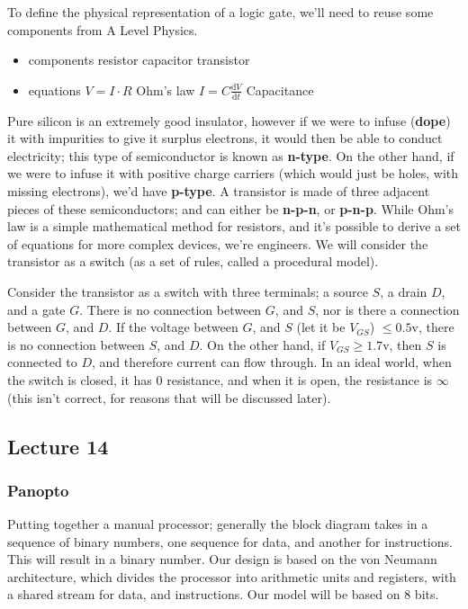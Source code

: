 \documentclass[a4paper, 12pt]{article}
\newcommand{\dif}[2]{\frac{\mathrm{d}#1}{\mathrm{d}#2}}
\begin{document}
                To define the physical representation of a logic gate, we'll need to reuse some components from A Level Physics.
                \begin{itemize}
                    \itemsep0em
                    \item components
                        \subitem resistor
                        \subitem capacitor
                        \subitem transistor
                    \item equations
                        \subitem $V = I \cdot R$ \hfill Ohm's law
                        \subitem $I = C\dif{V}{t}$ \hfill Capacitance
                \end{itemize}
                Pure silicon is an extremely good insulator, however if we were to infuse (\textbf{dope}) it with impurities to give it surplus electrons, it would then be able to conduct electricity; this type of semiconductor is known as \textbf{n-type}. On the other hand, if we were to infuse it with positive charge carriers (which would just be holes, with missing electrons), we'd have \textbf{p-type}. A transistor is made of three adjacent pieces of these semiconductors; and can either be \textbf{n-p-n}, or \textbf{p-n-p}. While Ohm's law is a simple mathematical method for resistors, and it's possible to derive a set of equations for more complex devices, we're engineers. We will consider the transistor as a switch (as a set of rules, called a procedural model).
                \medskip

                Consider the transistor as a switch with three terminals; a source $S$, a drain $D$, and a gate $G$. There is no connection between $G$, and $S$, nor is there a connection between $G$, and $D$. If the voltage between $G$, and $S$ (let it be $V_{GS}$) $\leq 0.5\mathrm{v}$, there is no connection between $S$, and $D$. On the other hand, if $V_{GS} \geq 1.7\mathrm{v}$, then $S$ is connected to $D$, and therefore current can flow through. In an ideal world, when the switch is closed, it has 0 resistance, and when it is open, the resistance is $\infty$ (this isn't correct, for reasons that will be discussed later).
        \subsection*{Lecture 14}
            \subsubsection*{Panopto}
                Putting together a manual processor; generally the block diagram takes in a sequence of binary numbers, one sequence for data, and another for instructions. This will result in a binary number. Our design is based on the von Neumann architecture, which divides the processor into arithmetic units and registers, with a shared stream for data, and instructions. Our model will be based on 8 bits.
                \medskip
\end{document}
